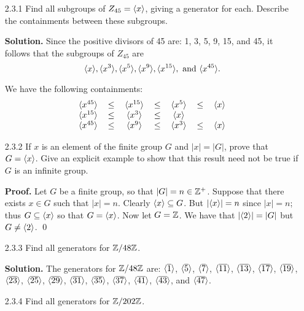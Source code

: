 \begin{enumerate}
   \item[2.3.1]   Find all subgroups of $Z_{45} = \langle x \rangle$, giving a generator
                  for each. Describe the containments between these subgroups.
                  
      \textbf{Solution.} Since the positive divisors of 45 are: 1, 3, 5, 9, 15,
      and 45, it follows that the subgroups of $Z_{45}$ are
      $$\langle x \rangle, \langle x^3 \rangle, \langle x^5 \rangle, \langle x^9 \rangle, \langle x^{15} \rangle, \text{ and }
        \langle x^{45} \rangle.$$
        
      We have the following containments:
      $$
         \begin{tabular}{>{$}c<{$}>{$}c<{$}>{$}c<{$}>
                          {$}c<{$}>{$}c<{$}>{$}c<{$}>{$}c<{$}}
            \cyc{x^{45}} & \le & \cyc{x^{15}} & \le & \cyc{x^5} & \le & \cyc{x} \\
            \cyc{x^{15}} & \le &  \cyc{x^3} & \le & \cyc{x} \\
            \cyc{x^{45}} & \le & \cyc{x^9} & \le &  \cyc{x^3} & \le & \cyc{x}
         \end{tabular}
      $$
   \item[2.3.2]   If $x$ is an element of the finite group $G$ and $|x| = |G|$,
                  prove that $G = \langle x \rangle$. Give an explicit example to show 
                  that this result need not be true if $G$ is an infinite group.
                  
      \textbf{Proof.} Let $G$ be a finite group, so that $|G| = n \in \mathbb{Z}^+$.
      Suppose that there exists $x \in G$ such that $|x| = n$. Clearly
      $\langle x \rangle \subseteq G$. But $|\langle x \rangle| = n$ since $|x| = n$; thus
      $G \subseteq \langle x \rangle$ so that $G = \langle x \rangle$. Now let $G = \mathbb{Z}$. We have
      that $|\langle 2 \rangle| = |G|$ but $G \neq \langle 2 \rangle$. \qed
   \item[2.3.3]   Find all generators for $\mathbb{Z}/48\mathbb{Z}$.
   
      \textbf{Solution.} The generators for $\mathbb{Z}/48\mathbb{Z}$ are: $\langle \overline{1} \rangle$,
      $\langle \overline{5} \rangle$, $\langle \overline{7} \rangle$, $\langle \overline{11} \rangle$,
      $\langle \overline{13} \rangle$, $\langle \overline{17} \rangle$, $\langle \overline{19} \rangle$,
      $\langle \overline{23} \rangle$, $\langle \overline{25} \rangle$, $\langle \overline{29} \rangle$,
      $\langle \overline{31} \rangle$, $\langle \overline{35} \rangle$, $\langle \overline{37} \rangle$,
      $\langle \overline{41} \rangle$, $\langle \overline{43} \rangle$, and $\langle \overline{47} \rangle$.
   \item[2.3.4]   Find all generators for $\mathbb{Z}/202\mathbb{Z}$.
   

\end{enumerate}
